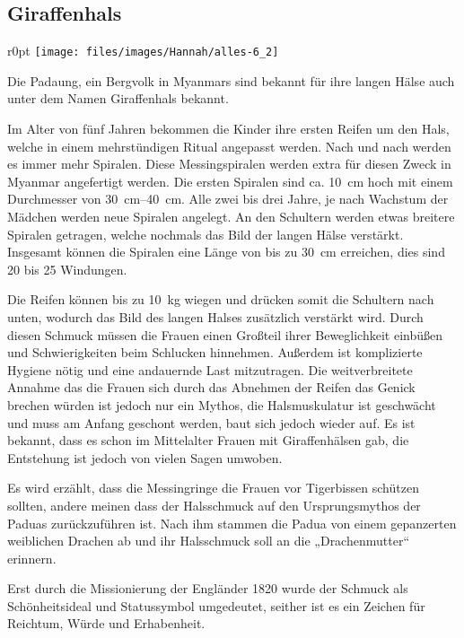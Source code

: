 \subsection{Giraffenhals}
\begin{wrapfigure}{r}{0pt}
	\texttt{[image: files/images/Hannah/alles-6\_2]}%
\end{wrapfigure}

Die Padaung, ein Bergvolk in Myanmars sind bekannt für ihre langen Hälse auch unter dem Namen
Giraffenhals bekannt.

Im Alter von fünf Jahren bekommen die Kinder ihre ersten Reifen um den Hals, welche in einem
mehrstündigen Ritual angepasst werden. Nach und nach werden es immer mehr Spiralen.
Diese Messingspiralen werden extra für diesen Zweck in Myanmar
angefertigt werden. Die ersten Spiralen sind ca. \SI{10}{\centi\metre} hoch mit einem Durchmesser von
\SIrange{30}{40}{\centi\metre}. Alle zwei bis drei Jahre, je nach Wachstum der Mädchen werden neue
Spiralen angelegt. An den Schultern werden etwas breitere Spiralen getragen, welche nochmals das Bild
der langen Hälse verstärkt. Insgesamt können die Spiralen eine Länge von bis zu \SI{30}{\centi\metre}
erreichen, dies sind 20 bis 25 Windungen.

Die Reifen können bis zu \SI{10}{\kilo\gram} wiegen und drücken somit die Schultern nach unten,
wodurch das Bild des langen Halses zusätzlich verstärkt wird.
Durch diesen Schmuck müssen die Frauen einen Großteil ihrer
Beweglichkeit einbüßen und Schwierigkeiten beim Schlucken hinnehmen. Außerdem ist komplizierte
Hygiene nötig und
eine andauernde Last mitzutragen. Die weitverbreitete Annahme das die Frauen sich durch das Abnehmen
der Reifen das Genick brechen würden ist jedoch nur ein Mythos, die Halsmuskulatur ist geschwächt und
muss am Anfang geschont werden, baut sich jedoch wieder auf. Es ist bekannt, dass es schon im
Mittelalter Frauen mit Giraffenhälsen gab, die Entstehung ist jedoch von vielen Sagen umwoben.

Es wird erzählt, dass die Messingringe die Frauen vor Tigerbissen schützen sollten, andere meinen
dass der Halsschmuck auf den Ursprungsmythos der Paduas zurückzuführen ist. Nach ihm stammen die
Padua von einem gepanzerten weiblichen Drachen ab und ihr Halsschmuck soll an die „Drachenmutter“
erinnern.

Erst durch die Missionierung der Engländer 1820 wurde der Schmuck als Schönheitsideal und
Statussymbol umgedeutet,
seither ist es ein Zeichen für Reichtum, Würde und Erhabenheit.

